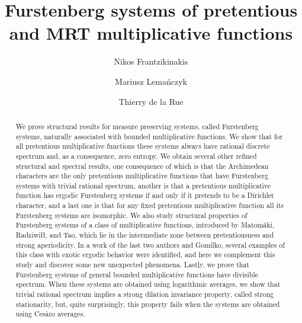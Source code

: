 \documentclass[11pt]{amsart}
\theoremstyle{definition}
\begin{document}
	
		\title[Furstenberg systems of pretentious and MRT multiplicative functions]{Furstenberg systems of pretentious and MRT multiplicative functions}


	
	\author{Nikos Frantzikinakis}
	\address[Nikos Frantzikinakis]{University of Crete, Department of Mathematics and Applied Mathematics, Voutes University Campus, Heraklion 71003, Greece} 
	
	
	\author{Mariusz Lema\'nczyk}
	\address[Mariusz Lema\'nczyk]{Faculty of Mathematics and Computer Science,
		Nicolaus Copernicus University, Toruń, Poland}		 
	
		\author{Thierry de la Rue}
	\address[Thierry de la Rue]{Universit\'e de Rouen Normandie, CNRS,
		Laboratoire de Math\'ematiques Rapha\"el Salem,
		Avenue de L’Universit\'e - 76801 Saint \'Etienne du Rouvray, France}		
	
\begin{abstract}
We prove structural results for measure preserving systems, called Furstenberg systems, naturally associated with bounded multiplicative functions.
We show that  for all pretentious multiplicative functions  these systems always have rational discrete spectrum and, as a consequence, zero entropy.
We obtain several other refined structural and spectral  results,
 one consequence  of which is that
 the Archimedean characters are the only pretentious multiplicative functions  that have Furstenberg systems with trivial rational spectrum,  another is that a pretentious multiplicative function has ergodic Furstenberg systems if and only if it pretends to be a Dirichlet character, and a last one is that for any fixed pretentious multiplicative function all its Furstenberg systems are isomorphic.
We also study structural properties  of Furstenberg systems of a class of multiplicative functions, introduced by Matom\"aki,  Radziwi{\l}{\l},  and  Tao, which  lie in the intermediate zone  between pretentiousness and   strong aperiodicity.  In a work of the last two authors and Gomilko, several examples of  this class with exotic ergodic behavior were identified, and here we complement this study and discover some new unexpected phenomena. Lastly, we prove that Furstenberg systems of general bounded multiplicative functions have divisible spectrum.  When these systems are obtained using logarithmic averages,  we show that  trivial rational spectrum implies a strong dilation invariance property, called
strong stationarity, but,  quite surprisingly, this property fails when the systems are obtained using Ces\`aro averages.
\end{abstract}
\end{document}
